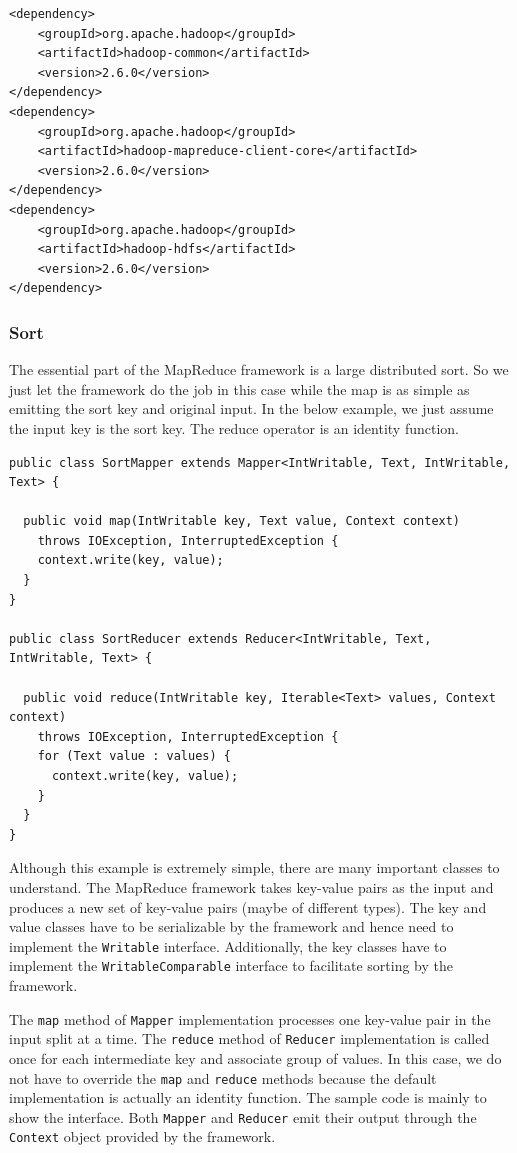 \documentclass[12pt]{book}
\begin{document}
\begin{lstlisting}
<dependency>
    <groupId>org.apache.hadoop</groupId>
    <artifactId>hadoop-common</artifactId>
    <version>2.6.0</version>
</dependency>
<dependency>
    <groupId>org.apache.hadoop</groupId>
    <artifactId>hadoop-mapreduce-client-core</artifactId>
    <version>2.6.0</version>
</dependency>
<dependency>
    <groupId>org.apache.hadoop</groupId>
    <artifactId>hadoop-hdfs</artifactId>
    <version>2.6.0</version>
</dependency>
\end{lstlisting}

\subsubsection{Sort}

The essential part of the MapReduce framework is a large distributed sort. So we just let the framework do the job in this case while the map is as simple as emitting the sort key and original input. In the below example, we just assume the input key is the sort key. The reduce operator is an identity function.

\begin{lstlisting}
public class SortMapper extends Mapper<IntWritable, Text, IntWritable, Text> {

  public void map(IntWritable key, Text value, Context context)
    throws IOException, InterruptedException {
    context.write(key, value);
  }
}

public class SortReducer extends Reducer<IntWritable, Text, IntWritable, Text> {

  public void reduce(IntWritable key, Iterable<Text> values, Context context)
    throws IOException, InterruptedException {
    for (Text value : values) {
      context.write(key, value);
    }
  }
}
\end{lstlisting}

Although this example is extremely simple, there are many important classes to understand. The MapReduce framework takes key-value pairs as the input and produces a new set of key-value pairs (maybe of different types).
The key and value classes have to be serializable by the framework and hence need to implement the \texttt{Writable} interface. Additionally, the key classes have to implement the \texttt{WritableComparable} interface to facilitate sorting by the framework.

The \texttt{map} method of \texttt{Mapper} implementation processes one key-value pair in the input split at a time. The \texttt{reduce} method of \texttt{Reducer} implementation is called once for each intermediate key and associate group of values. In this case, we do not have to override the \texttt{map} and \texttt{reduce} methods because the default implementation is actually an identity function. The sample code is mainly to show the interface. Both \texttt{Mapper} and \texttt{Reducer} emit their output through the \texttt{Context} object provided by the framework.
\end{document}
